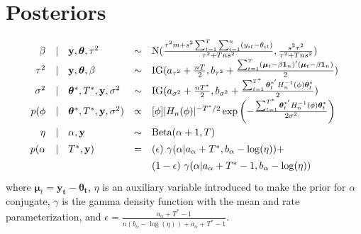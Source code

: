 \documentclass{article}
\def\ds{\displaystyle}
\newcommand{\m}[1]{\mathbf{\bm{#1}}} %
\def\ds{\displaystyle}
\begin{document}
\section{Posteriors}
\[\def\arraystretch{1.4}
  \begin{array}{rclcl}
    \beta &|& \m y, \m\theta, \tau^2  &\sim& \text{N}(
      \frac{\tau^2m + s^2\sum_{t=1}^T\sum_{i=1}^n(y_{it}-\theta_{it})}{\tau^2+Tns^2},
      \frac{s^2\tau^2}{\tau^2+Tns^2}) \\
    \tau^2 &|& \m y, \m\theta, \beta  &\sim& \text{IG}(a_{\tau^2}+\frac{nT}{2},
    b_{\tau^2}+\frac{\sum_{t=1}^T (\m\mu_t-\beta \m1_n)'(\m\mu_t-\beta \m1_n)}{2})\\
    \sigma^2 &|& \m\theta^*, T^*, \m y, \sigma^2 &\sim& \text{IG}(a_{\sigma^2}+\frac{nT^*}{2},
    b_{\sigma^2}+\frac{\sum_{t=1}^{T^*}\m\theta_t^{*'} H_n^{-1}(\phi)\m\theta_t^*}{2})\\
    p(\phi &|& \m\theta^*, T^*, \m y, \sigma^2) &\propto& 
    [\phi]|H_n(\phi)|^{-T^*/2} \exp\left(-\frac{\sum_{t=1}^{T^*}\m\theta_t^{*'} H_n^{-1}(\phi)\m\theta_t^*}{2\sigma^2}\right)\\
    \eta &|& \alpha, \m y &\sim& \text{Beta}(\alpha+1,T)\\
    p(\alpha &|& T^*, \m y) &=& (\epsilon)~\gamma(\alpha | a_\alpha+T^*, b_\alpha-\log(\eta)) +\\
             &&&&(1-\epsilon)~\gamma(\alpha | a_\alpha+T^*-1, b_\alpha-\log(\eta))\\
  \end{array}
\]
where $\m\mu_t=\m{y_t -\theta_t} $, $\eta$ is an auxiliary variable introduced
to make the prior for $\alpha$ conjugate, $\gamma$ is the gamma density
function with the mean and rate parameterization, and 
$\epsilon = \ds\frac{a_\alpha +T^* - 1}{ n(b_\alpha-\log(\eta)) + a_\alpha +T^* -1}$.
\end{document}

